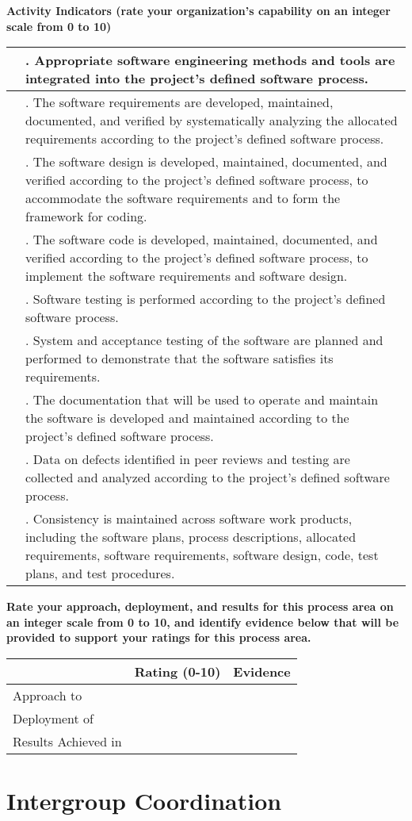 \documentclass{article}
\newcommand{\KPAname}{}
\newenvironment{KPARate}[1]
	{\renewcommand{\KPAname}{#1}
	 {\bf Rate your approach, deployment, and results for
	  this process area on an integer scale from 0 to 10, and 
	  identify evidence below that will be provided to support your
	  ratings for this process area.}
	 \begin{center}
	 \begin{tabular}{|p{1.0in}|p{0.5in}|p{5.0in}|} \hline
	 & Rating (0-10) & \multicolumn{1}{c|}{Evidence} \\ \hline}
	{\end{tabular}
	 \end{center}}
\newcommand{\Approach}[2]{Approach to \KPAname & #1 & #2 \\ \hline}
\newcommand{\Deployment}[2]{Deployment of \KPAname & #1 & #2 \\ \hline}
\newcommand{\Results}[2]{Results Achieved in \KPAname & #1 & #2 \\
	\hline}
\newcounter{activity}
\newenvironment{KPAActivity}
	{
	 \setcounter{activity}{0}
	 {\bf Activity Indicators (rate your organization's capability
	 on an integer scale from 0 to 10)}
	 \begin{center}
	 \begin{tabular}{|p{0.5in}|p{6.0in}|} \hline
	}
	{
	 \end{tabular}
	 \end{center}
	}
\newcommand{\Activity}[2]{\stepcounter{activity} #1 &
\arabic{activity}. #2 \\ \hline}
\begin{document}
\begin{KPAActivity}
\Activity{}{Appropriate software engineering methods and tools are
integrated into the project's defined software process.}
\Activity{}{The software requirements are developed, maintained,
documented, and verified by systematically analyzing the allocated
requirements according to the project's defined software process.}
\Activity{}{The software design is developed, maintained, documented,
and verified according to the project's defined software process, to
accommodate the software requirements and to form the framework for
coding.}
\Activity{}{The software code is developed, maintained, documented,
and verified according to the project's defined software process, to
implement the software requirements and software design.}
\Activity{}{Software testing is performed according to the project's
defined software process.}
\Activity{}{System and acceptance testing of the software are planned
and performed to demonstrate that the software satisfies its
requirements.}
\Activity{}{The documentation that will be used to operate and
maintain the software is developed and maintained according to the
project's defined software process.}
\Activity{}{Data on defects identified in peer reviews and testing are
collected and analyzed according to the project's defined software
process.}
\Activity{}{Consistency is maintained across software work products,
including the software plans, process descriptions, allocated
requirements, software requirements, software design, code, test
plans, and test procedures.}
\end{KPAActivity}

\begin{KPARate}{Software Product Engineering}
\Approach{}{}
\Deployment{}{}
\Results{}{}
\end{KPARate}

\newpage
\section{Intergroup Coordination}
\end{document}
